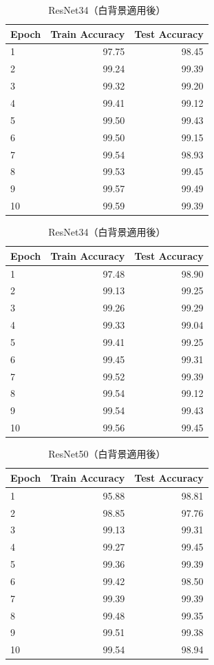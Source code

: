 \documentclass[a4paper,11pt,titlepage]{jsarticle}
\begin{document}
\begin{table}[H]
\begin{minipage}{0.49\hsize}
\centering
\caption{ResNet18（白背景適用後）}
\label{tab:Resnet18_white}
\begin{tabular}{lrr}
\hline
Epoch & Train Accuracy & Test Accuracy \\
\hline
1 & 97.75 & 98.45 \\
2 & 99.24 & 99.39 \\
3 & 99.32 & 99.20 \\
4 & 99.41 & 99.12 \\
5 & 99.50 & 99.43 \\
6 & 99.50 & 99.15 \\
7 & 99.54 & 98.93 \\
8 & 99.53 & 99.45 \\
9 & 99.57 & 99.49 \\
10 & 99.59 & 99.39 \\
\hline
\end{tabular}
\end{minipage}
\hfill
\begin{minipage}{0.49\hsize}
\centering
\caption{ResNet34（白背景適用後）}
\label{tab:Resnet34_white}
\begin{tabular}{lrr}
\hline
Epoch & Train Accuracy & Test Accuracy \\
\hline
1 & 97.48 & 98.90 \\
2 & 99.13 & 99.25 \\
3 & 99.26 & 99.29 \\
4 & 99.33 & 99.04 \\
5 & 99.41 & 99.25 \\
6 & 99.45 & 99.31 \\
7 & 99.52 & 99.39 \\
8 & 99.54 & 99.12 \\
9 & 99.54 & 99.43 \\
10 & 99.56 & 99.45 \\
\hline
\end{tabular}
\end{minipage}
\end{table}

\begin{table}[H]
\centering
\caption{ResNet50（白背景適用後）}
\label{tab:Resnet50_white}
\begin{tabular}{lrr}
\hline
Epoch & Train Accuracy & Test Accuracy \\
\hline
1 & 95.88 & 98.81 \\
2 & 98.85 & 97.76 \\
3 & 99.13 & 99.31 \\
4 & 99.27 & 99.45 \\
5 & 99.36 & 99.39 \\
6 & 99.42 & 98.50 \\
7 & 99.39 & 99.39 \\
8 & 99.48 & 99.35 \\
9 & 99.51 & 99.38 \\
10 & 99.54 & 98.94 \\
\hline
\end{tabular}
\end{table}
\end{document}
